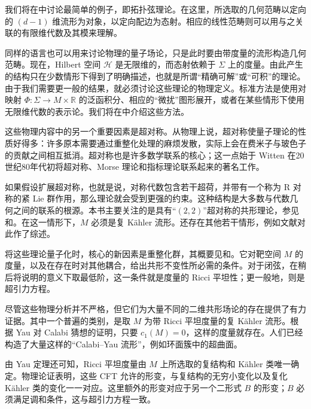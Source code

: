 我们将在中讨论最简单的例子，即拓扑弦理论。在这里，所选取的几何范畴以定向的 $(d-1)$ 维流形为对象，以定向配边为态射。相应的线性范畴则可以用与之关联的有限维代数及其模来理解。

同样的语言也可以用来讨论物理的量子场论，只是此时要由带度量的流形构造几何范畴。现在，Hilbert 空间 $\mathcal{H}$ 是无限维的，而态射依赖于 $\Sigma$ 上的度量。由此产生的结构只在少数情形下得到了明确描述，也就是所谓“精确可解”或“可积”的理论。由于我们需要更一般的结果，就必须讨论这些理论的物理定义。标准方法是使用对映射 $\Phi\colon\Sigma\to M\times\mathbb{R}$ 的泛函积分、相应的“微扰”图形展开，或者在某些情形下使用无限维代数的表示论。我们将在中介绍这些方法。

这些物理内容中的另一个重要因素是超对称。从物理上说，超对称使量子理论的性质好得多：许多原本需要通过重整化处理的麻烦发散，实际上会在费米子与玻色子的贡献之间相互抵消。超对称也是许多数学联系的核心；这一点始于 Witten 在20世纪80年代初将超对称、Morse 理论和指标理论联系起来的著名工作。

如果假设扩展超对称，也就是说，对称代数包含若干超荷，并带有一个称为 R 对称的紧 Lie 群作用，那么理论就会受到更强的约束。这种结构是大多数与代数几何之间的联系的根源。本书主要关注的是具有“$(2,2)$”超对称的共形理论，参见和。在这一情形下，$M$ 必须是复 Kähler 流形。还存在其他若干情形，例如文献对此作了综述。

将这些理论量子化时，核心的新因素是重整化群，其概要见和。它对靶空间 $M$ 的度量，以及在存在时对其他耦合，给出共形不变性所必需的条件。对于闭弦，在稍后将说明的意义下取最低阶，这一条件就是度量的 Ricci 平坦性；更一般地，则是超引力方程。

尽管这些物理分析并不严格，但它们为大量不同的二维共形场论的存在提供了有力证据。其中一个普遍的类别，是取 $M$ 为带 Ricci 平坦度量的复 Kähler 流形。根据 Yau 对 Calabi 猜想的证明，只要 $c_1(M)=0$，这样的度量就存在。人们已经构造了大量这样的“Calabi--Yau 流形”，例如环面簇中的超曲面。

由 Yau 定理还可知，Ricci 平坦度量由 $M$ 上所选取的复结构和 Kähler 类唯一确定。物理论证表明，这些 CFT 允许的形变，与复结构的无穷小变化以及复化 Kähler 类的变化一一对应。这里额外的形变对应于另一个二形式 $B$ 的形变；$B$ 必须满足调和条件，这与超引力方程一致。

